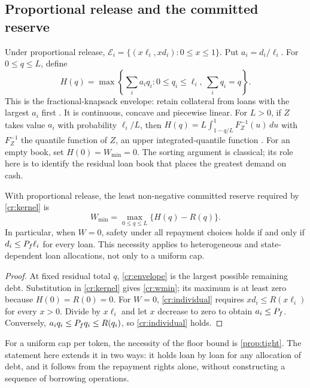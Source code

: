 \subsection{Proportional release and the committed reserve}\label{cr:proportional}\label{sec:credit-buffer}

Under proportional release, $\mathcal E_i=\{(x\ell_i,xd_i):0\le x\le1\}$. Put $a_i=d_i/\ell_i$. For $0\le q\le L$, define
\begin{equation}\label{cr:envelope}
H(q)=\max\left\{\sum_i a_iq_i:
0\le q_i\le\ell_i,\ \sum_iq_i=q\right\}.
\end{equation}
This is the fractional-knapsack envelope: retain collateral from loans with the largest $a_i$ first \citep{kellerer2004}. It is continuous, concave and piecewise linear. For $L>0$, if $Z$ takes value $a_i$ with probability $\ell_i/L$, then $H(q)=L\int_{1-q/L}^{1}F_Z^{-1}(u)\,du$ with $F_Z^{-1}$ the quantile function of $Z$, an upper integrated-quantile function \citep{gushchin2017}. For an empty book, set $H(0)=W_{\min}=0$. The sorting argument is classical; its role here is to identify the residual loan book that places the greatest demand on cash.

\begin{theorem}\label{cr:buffer}
With proportional release, the least non-negative committed reserve required by \cref{cr:kernel} is
\begin{equation}\label{cr:wmin}
W_{\min}=\max_{0\le q\le L}\{H(q)-R(q)\}.
\end{equation}
In particular, when $W=0$, safety under all repayment choices holds if and only if $d_i\le P_f\ell_i$ for every loan. This necessity applies to heterogeneous and state-dependent loan allocations, not only to a uniform cap.
\end{theorem}
\begin{proof}
At fixed residual total $q$, \eqref{cr:envelope} is the largest possible remaining debt. Substitution in \cref{cr:kernel} gives \eqref{cr:wmin}; its maximum is at least zero because $H(0)=R(0)=0$. For $W=0$, \eqref{cr:individual} requires $xd_i\le R(x\ell_i)$ for every $x>0$. Divide by $x\ell_i$ and let $x$ decrease to zero to obtain $a_i\le P_f$. Conversely, $a_iq_i\le P_f q_i\le R(q_i)$, so \eqref{cr:individual} holds.
\end{proof}

For a uniform cap per token, the necessity of the floor bound is \cref{prop:tight}. The statement here extends it in two ways: it holds loan by loan for any allocation of debt, and it follows from the repayment rights alone, without constructing a sequence of borrowing operations.

